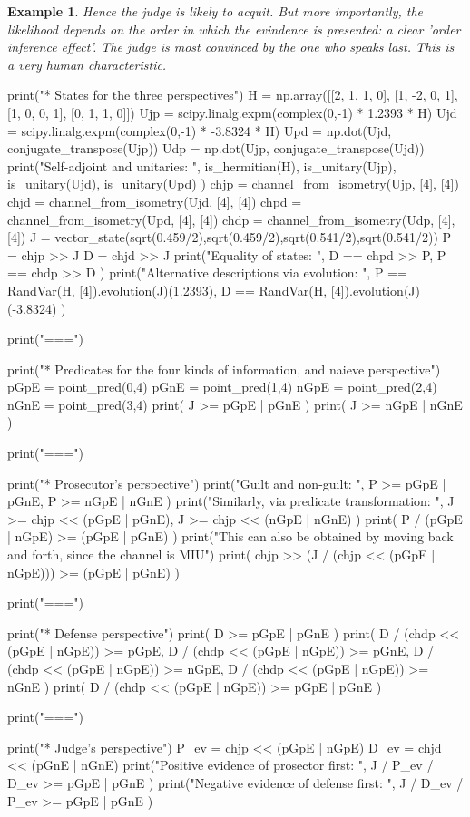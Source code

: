 \documentclass[leqno]{tufte-book} %
\newtheorem{example}[theorem]{Example}
\begin{document}
{\begin{example}
\noindent Hence the judge is likely to acquit. But more importantly,
the likelihood depends on the order in which the evindence is
presented: a clear 'order inference effect'. The judge is most
convinced by the one who speaks last. This is a very human
characteristic.
\end{example}

    print("* States for the three perspectives")
    H = np.array([[2, 1, 1, 0],
                  [1, -2, 0, 1],
                  [1, 0, 0, 1],
                  [0, 1, 1, 0]])
    Ujp = scipy.linalg.expm(complex(0,-1) * 1.2393 * H)
    Ujd = scipy.linalg.expm(complex(0,-1) * -3.8324 * H)
    Upd = np.dot(Ujd, conjugate_transpose(Ujp))
    Udp = np.dot(Ujp, conjugate_transpose(Ujd))
    print("Self-adjoint and unitaries: ",
          is_hermitian(H), is_unitary(Ujp), is_unitary(Ujd), is_unitary(Upd) )
    chjp = channel_from_isometry(Ujp, [4], [4])
    chjd = channel_from_isometry(Ujd, [4], [4])
    chpd = channel_from_isometry(Upd, [4], [4])
    chdp = channel_from_isometry(Udp, [4], [4])
    J = vector_state(sqrt(0.459/2),sqrt(0.459/2),sqrt(0.541/2),sqrt(0.541/2))
    P = chjp >> J
    D = chjd >> J
    print("Equality of states: ", D == chpd >> P, P == chdp >> D )
    print("Alternative descriptions via evolution: ",
          P == RandVar(H, [4]).evolution(J)(1.2393),
          D == RandVar(H, [4]).evolution(J)(-3.8324) )

    print("\n===\n")

    print("* Predicates for the four kinds of information, and naieve perspective")
    pGpE = point_pred(0,4)
    pGnE = point_pred(1,4)
    nGpE = point_pred(2,4)
    nGnE = point_pred(3,4)
    print( J >= pGpE | pGnE )
    print( J >= nGpE | nGnE )

    print("\n===\n")

    print("* Prosecutor's perspective")
    print("Guilt and non-guilt: ", P >= pGpE | pGnE, P >= nGpE | nGnE )
    print("Similarly, via predicate transformation: ",
          J >= chjp << (pGpE | pGnE), J >= chjp << (nGpE | nGnE) )
    print( P / (pGpE | nGpE) >= (pGpE | pGnE) )
    print("This can also be obtained by moving back and forth, since the channel is MIU")
    print( chjp >> (J / (chjp << (pGpE | nGpE))) >= (pGpE | pGnE) )

    print("\n===\n")

    print("* Defense perspective")
    print( D >= pGpE | pGnE )
    print( D / (chdp << (pGpE | nGpE)) >= pGpE, 
           D / (chdp << (pGpE | nGpE)) >= pGnE,
           D / (chdp << (pGpE | nGpE)) >= nGpE,
           D / (chdp << (pGpE | nGpE)) >= nGnE )
    print( D / (chdp << (pGpE | nGpE)) >= pGpE | pGnE )

    print("\n===\n")

    print("* Judge's perspective")
    P_ev = chjp << (pGpE | nGpE)
    D_ev = chjd << (pGnE | nGnE)
    print("Positive evidence of prosector first: ",
          J / P_ev / D_ev >= pGpE | pGnE )
    print("Negative evidence of defense first: ",
          J / D_ev / P_ev >= pGpE | pGnE )

}
\end{document}
